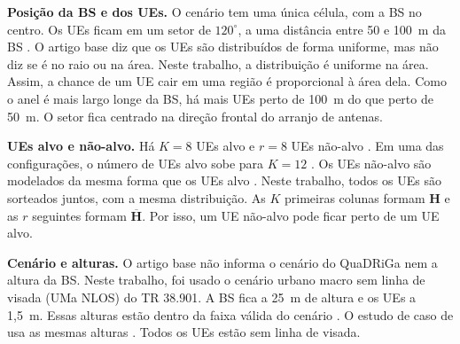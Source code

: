 \textbf{Posição da BS e dos UEs.} O cenário tem uma única célula, com a BS no centro. Os UEs ficam em um setor de $120^\circ$, a uma distância entre 50 e 100~m da BS \cite{zhao-lmmse}. O artigo base diz que os UEs são distribuídos de forma uniforme, mas não diz se é no raio ou na área. Neste trabalho, a distribuição é uniforme na área. Assim, a chance de um UE cair em uma região é proporcional à área dela. Como o anel é mais largo longe da BS, há mais UEs perto de 100~m do que perto de 50~m. O setor fica centrado na direção frontal do arranjo de antenas.

\textbf{UEs alvo e não-alvo.} Há $K=8$ UEs alvo e $r=8$ UEs não-alvo \cite{zhao-lmmse}. Em uma das configurações, o número de UEs alvo sobe para $K=12$ \cite{zhao-lmmse}. Os UEs não-alvo são modelados da mesma forma que os UEs alvo \cite{zhao-lmmse}. Neste trabalho, todos os UEs são sorteados juntos, com a mesma distribuição. As $K$ primeiras colunas formam $\mathbf{H}$ e as $r$ seguintes formam $\overline{\mathbf{H}}$. Por isso, um UE não-alvo pode ficar perto de um UE alvo.

\textbf{Cenário e alturas.} O artigo base não informa o cenário do QuaDRiGa nem a altura da BS. Neste trabalho, foi usado o cenário urbano macro sem linha de visada (UMa NLOS) do TR 38.901. A BS fica a 25~m de altura e os UEs a 1,5~m. Essas alturas estão dentro da faixa válida do cenário \cite{tr38901}. O estudo de caso de  usa as mesmas alturas \cite[p.~386--387]{bjornson-mimo}. Todos os UEs estão sem linha de visada.


